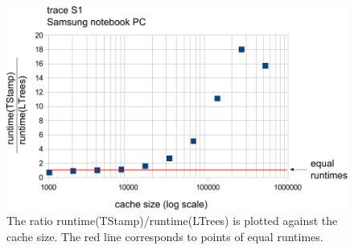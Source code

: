 \documentclass[a4paper,12pt, titlepage]{article}  %
\begin{document}
\begin{figure}[p]
	\centering
	\includegraphics[scale=0.8]{./experiments/samsung_S1.pdf}
	\caption{The ratio runtime(TStamp)/runtime(LTrees) is plotted against the cache size.
                     The red line corresponds to points of equal runtimes.} 
	\label{fig:samsung_S1}
\end{figure}
\end{document}
